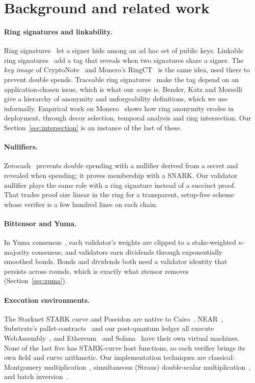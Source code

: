 \documentclass[11pt]{article}
\theoremstyle{remark}
\begin{document}
\section{Background and related work}\label{sec:related}

\paragraph{Ring signatures and linkability.} Ring signatures~\cite{rst01} let a signer hide among an ad hoc set of public keys. Linkable ring signatures~\cite{lww04} add a tag that reveals when two signatures share a signer. The \emph{key image} of CryptoNote~\cite{cryptonote} and Monero's RingCT~\cite{ringct} is the same idea, used there to prevent double spends. Traceable ring signatures~\cite{fs07} make the tag depend on an application-chosen issue, which is what our \emph{scope} is. Bender, Katz and Morselli~\cite{bkm06} give a hierarchy of anonymity and unforgeability definitions, which we use informally. Empirical work on Monero~\cite{kumar17,moser18} shows how ring anonymity erodes in deployment, through decoy selection, temporal analysis and ring intersection. Our Section~\ref{sec:intersection} is an instance of the last of these.

\paragraph{Nullifiers.} Zerocash~\cite{zerocash} prevents double spending with a nullifier derived from a secret and revealed when spending; it proves membership with a SNARK. Our validator nullifier plays the same role with a ring signature instead of a succinct proof. That trades proof size linear in the ring for a transparent, setup-free scheme whose verifier is a few hundred lines on each chain.

\paragraph{Bittensor and Yuma.} In Yuma consensus~\cite{yumadocs}, each validator's weights are clipped to a stake-weighted $\kappa$-majority consensus, and validators earn dividends through exponentially smoothed bonds. Bonds and dividends both need a validator identity that persists across rounds, which is exactly what ztensor removes (Section~\ref{sec:zuma}).

\paragraph{Execution environments.} The Starknet STARK curve and Poseidon are native to Cairo~\cite{cairo,stark}. NEAR~\cite{nightshade}, Substrate's pallet-contracts~\cite{polkadot,ink} and our post-quantum ledger all execute WebAssembly~\cite{wasm}, and Ethereum~\cite{yellowpaper} and Solana~\cite{solana} have their own virtual machines. None of the last five has STARK-curve host functions, so each verifier brings its own field and curve arithmetic. Our implementation techniques are classical: Montgomery multiplication~\cite{montgomery85}, simultaneous (Straus) double-scalar multiplication~\cite{straus64}, and batch inversion~\cite{montgomery87}.
\end{document}
